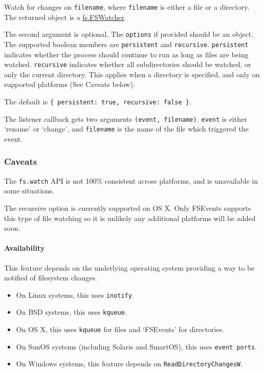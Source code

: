 \begin{Shaded}
\begin{Highlighting}[]
 \NormalTok{- }
\end{Highlighting}
\end{Shaded}

Watch for changes on \texttt{filename}, where \texttt{filename} is
either a file or a directory. The returned object is a
\hyperref[fsux5fclassux5ffsux5ffswatcher]{fs.FSWatcher}.

The second argument is optional. The \texttt{options} if provided should
be an object. The supported boolean members are \texttt{persistent} and
\texttt{recursive}. \texttt{persistent} indicates whether the process
should continue to run as long as files are being watched.
\texttt{recursive} indicates whether all subdirectories should be
watched, or only the current directory. This applies when a directory is
specified, and only on supported platforms (See Caveats below).

The default is \texttt{\{ persistent: true, recursive: false \}}.

The listener callback gets two arguments \texttt{(event, filename)}.
\texttt{event} is either `rename' or `change', and \texttt{filename} is
the name of the file which triggered the event.

\subsubsection{Caveats}\label{caveats}

The \texttt{fs.watch} API is not 100\% consistent across platforms, and
is unavailable in some situations.

The recursive option is currently supported on OS X. Only FSEvents
supports this type of file watching so it is unlikely any additional
platforms will be added soon.

\paragraph{Availability}\label{availability}

This feature depends on the underlying operating system providing a way
to be notified of filesystem changes.

\begin{itemize}
\itemsep1pt\parskip0pt
\item
  On Linux systems, this uses \texttt{inotify}.
\item
  On BSD systems, this uses \texttt{kqueue}.
\item
  On OS X, this uses \texttt{kqueue} for files and `FSEvents' for
  directories.
\item
  On SunOS systems (including Solaris and SmartOS), this uses
  \texttt{event ports}.
\item
  On Windows systems, this feature depends on
  \texttt{ReadDirectoryChangesW}.
\end{itemize}

